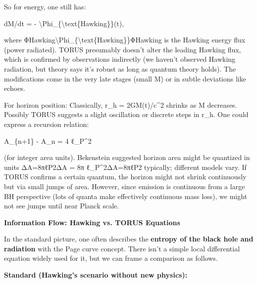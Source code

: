 \documentclass[]{article}
\begin{document}
So for energy, one still has:

dM/dt = - \textbackslash{}Phi\_\{\textbackslash{}text\{Hawking\}\}(t),

where
ΦHawking\textbackslash{}Phi\_\{\textbackslash{}text\{Hawking\}\}ΦHawking​
is the Hawking energy flux (power radiated). TORUS presumably doesn't
alter the leading Hawking flux, which is confirmed by observations
indirectly (we haven't observed Hawking radiation, but theory says it's
robust as long as quantum theory holds). The modifications come in the
very late stages (small M) or in subtle deviations like echoes.

For horizon position: Classically, r\_h = 2GM(t)/c\^{}2 shrinks as M
decreases. Possibly TORUS suggests a slight oscillation or discrete
steps in r\_h. One could express a recursion relation:

A\_\{n+1\} - A\_n = 4 ℓ\_P\^{}2

(for integer area units). Bekenstein suggested horizon area might be
quantized in units ΔA=8πℓP2ΔA = 8π ℓ\_P\^{}2ΔA=8πℓP2​ typically;
different models vary. If TORUS confirms a certain quantum, the horizon
might not shrink continuously but via small jumps of area. However,
since emission is continuous from a large BH perspective (lots of quanta
make effectively continuous mass loss), we might not see jumps until
near Planck scale.

\textbf{Information Flow: Hawking vs. TORUS Equations}

In the standard picture, one often describes the \textbf{entropy of the
black hole and radiation} with the Page curve concept. There isn't a
simple local differential equation widely used for it, but we can frame
a comparison as follows.

\textbf{Standard (Hawking's scenario without new physics):}
\end{document}
